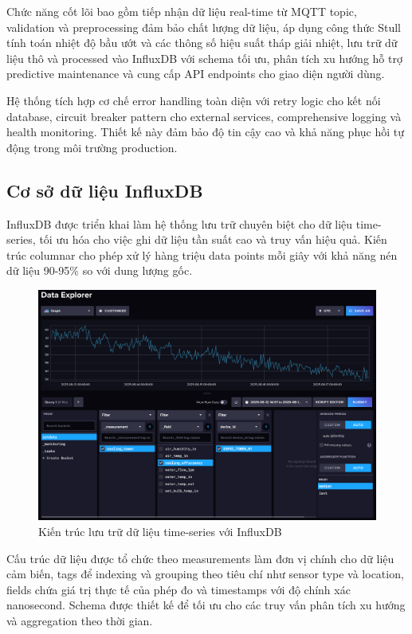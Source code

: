 \documentclass[../main.tex]{subfiles}
\begin{document}
Chức năng cốt lõi bao gồm tiếp nhận dữ liệu real-time từ MQTT topic, validation và preprocessing đảm bảo chất lượng dữ liệu, áp dụng công thức Stull tính toán nhiệt độ bầu ướt và các thông số hiệu suất tháp giải nhiệt, lưu trữ dữ liệu thô và processed vào InfluxDB với schema tối ưu, phân tích xu hướng hỗ trợ predictive maintenance và cung cấp API endpoints cho giao diện người dùng.

Hệ thống tích hợp cơ chế error handling toàn diện với retry logic cho kết nối database, circuit breaker pattern cho external services, comprehensive logging và health monitoring. Thiết kế này đảm bảo độ tin cậy cao và khả năng phục hồi tự động trong môi trường production.

\subsection{Cơ sở dữ liệu InfluxDB}
\label{sec:influxdb_database}

InfluxDB được triển khai làm hệ thống lưu trữ chuyên biệt cho dữ liệu time-series, tối ưu hóa cho việc ghi dữ liệu tần suất cao và truy vấn hiệu quả. Kiến trúc columnar cho phép xử lý hàng triệu data points mỗi giây với khả năng nén dữ liệu 90-95\% so với dung lượng gốc.

\begin{figure}
    \centering
    \includegraphics[width=1\textwidth]{../Hinhve/influxdb.png}
    \caption{Kiến trúc lưu trữ dữ liệu time-series với InfluxDB}
    \label{fig:influxdb_architecture}
\end{figure}

Cấu trúc dữ liệu được tổ chức theo measurements làm đơn vị chính cho dữ liệu cảm biến, tags để indexing và grouping theo tiêu chí như sensor type và location, fields chứa giá trị thực tế của phép đo và timestamps với độ chính xác nanosecond. Schema được thiết kế để tối ưu cho các truy vấn phân tích xu hướng và aggregation theo thời gian.
\end{document}
